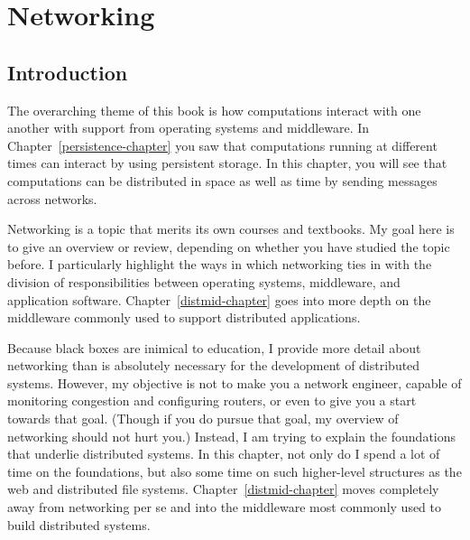 \chapter{Networking}
\label{networking-chapter}

\section{Introduction}

The overarching theme of this book is how computations interact with
one another with support from operating systems and middleware.  In
Chapter~\ref{persistence-chapter} you saw that computations running at different
times can interact by using persistent storage.  In this chapter,
you will see that computations can be distributed in space as well as
time by sending messages across networks.

Networking is a topic that merits its own courses and textbooks.  My
goal here is to give an overview or review, depending on whether you
have studied the topic before.  I particularly highlight the ways in
which networking ties in with the division of responsibilities
between operating systems, middleware, and application software.
Chapter~\ref{distmid-chapter} goes into more depth on the middleware commonly used to
support distributed applications.

Because black boxes are inimical to education, I
provide more detail about networking than is absolutely
necessary for the development of distributed systems.  However, my
objective is not to make you a network engineer, capable of monitoring
congestion and configuring routers, or even to give you a start
towards that goal.  (Though if you do pursue that goal, my overview
of networking should not hurt you.)  Instead, I am trying to
explain the foundations that underlie distributed systems.  In this
chapter, not only do I spend a lot of time on the foundations, but also some time on
such higher-level structures as the web and distributed file systems.
Chapter~\ref{distmid-chapter} moves completely away from networking per se and into
the middleware most commonly used to build distributed systems.

